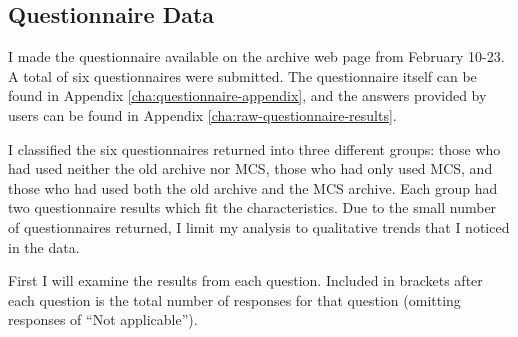 
\subsection{Questionnaire Data}
\label{sec:questionnaire-data}
I made the questionnaire available on the archive web page from February 10-23.
A total of six questionnaires were submitted. The questionnaire itself can be
found in Appendix \ref{cha:questionnaire-appendix}, and the answers provided by
users can be found in Appendix \ref{cha:raw-questionnaire-results}.

I classified the six questionnaires returned into three different groups: those
who had used neither the old archive nor MCS, those who had only used MCS, and
those who had used both the old archive and the MCS archive. Each group had two
questionnaire results which fit the characteristics. Due to the small number of
questionnaires returned, I limit my analysis to qualitative trends that I
noticed in the data.

First I will examine the results from each question. Included in brackets
after each question is the total number of responses for that question
(omitting responses of ``Not applicable'').

